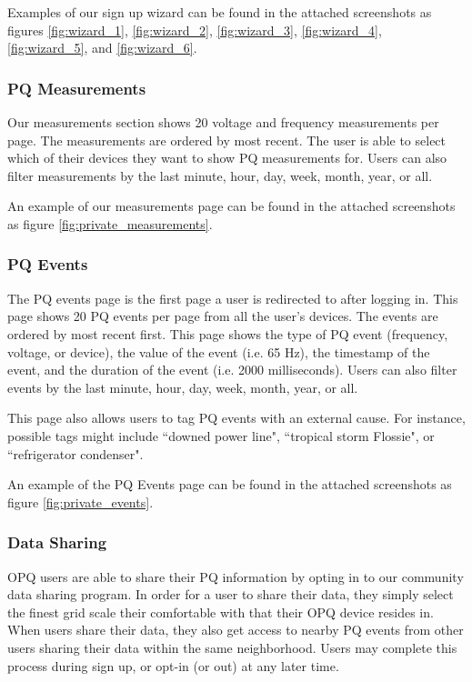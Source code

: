 \documentclass[11pt]{article}
\begin{document}
Examples of our sign up wizard can be found in the attached screenshots as figures \ref{fig:wizard_1}, \ref{fig:wizard_2}, \ref{fig:wizard_3}, \ref{fig:wizard_4}, \ref{fig:wizard_5}, and \ref{fig:wizard_6}.

\subsubsection{PQ Measurements}
Our measurements section shows 20 voltage and frequency measurements per page. The measurements are ordered by most recent. The user is able to select which of their devices they want to show PQ measurements for. Users can also filter measurements by the last minute, hour, day, week, month, year, or all. 

An example of our measurements page can be found in the attached screenshots as figure \ref{fig:private_measurements}.

\subsubsection{PQ Events}
The PQ events page is the first page a user is redirected to after logging in. This page shows  20 PQ events per page from all the user's devices. The events are ordered by most recent first. This page shows the type of PQ event (frequency, voltage, or device), the value of the event (i.e. 65 Hz), the timestamp of the event, and the duration of the event (i.e. 2000 milliseconds). Users can also filter events by the last minute, hour, day, week, month, year, or all.

This page also allows users to tag PQ events with an external cause. For instance, possible tags might include ``downed power line", ``tropical storm Flossie", or ``refrigerator condenser". 

An example of the PQ Events page can be found in the attached screenshots as figure \ref{fig:private_events}.

\subsubsection{Data Sharing}
OPQ users are able to share their PQ information by opting in to our community data sharing program. In order for a user to share their data, they simply select the finest grid scale their comfortable with that their OPQ device resides in. When users share their data, they also get access to nearby PQ events from other users sharing their data within the same neighborhood. Users may complete this process during sign up, or opt-in (or out) at any later time.
\end{document}
